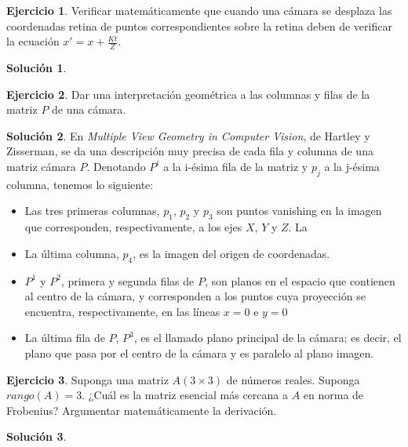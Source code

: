 \documentclass[a4paper, 11pt]{article}
\theoremstyle{definition}
\newtheorem{ejercicio}{Ejercicio}
\newtheorem*{solucion}{Solución}
\theoremstyle{theorem}
\begin{document}
    \begin{ejercicio}
        Verificar matemáticamente que cuando una cámara se desplaza las coordenadas retina de puntos correspondientes sobre la retina deben de verificar la ecuación $x'= x + \frac{Kt}{Z}$.
    \end{ejercicio}

    \begin{solucion}

    \end{solucion}

    \begin{ejercicio}
        Dar una interpretación geométrica a las columnas y filas de la matriz $P$ de una cámara.
    \end{ejercicio}

    \begin{solucion}
        En \emph{Multiple View Geometry in Computer Vision}, de Hartley y Zisserman, se da una descripción muy precisa de cada fila y columna de una matriz cámara $P$. Denotando $P^i$ a la i-ésima fila de la matriz y $p_j$ a la j-ésima columna, tenemos lo siguiente:
        \begin{itemize}
            \item Las tres primeras columnas, $p_1$, $p_2$ y $p_3$ son puntos vanishing en la imagen que corresponden, respectivamente, a los ejes $X$, $Y$ y $Z$. La \item La última columna, $p_4$, es la imagen del origen de coordenadas.
            \item $P^1$ y $P^2$, primera y segunda filas de $P$, son planos en el espacio que contienen al centro de la cámara, y corresponden a los puntos cuya proyección se encuentra, respectivamente, en las líneas $x=0$ e $y=0$
            \item La última fila de $P$, $P^3$, es el llamado plano principal de la cámara; es decir, el plano que pasa por el centro de la cámara y es paralelo al plano imagen.
        \end{itemize}
    \end{solucion}

    \begin{ejercicio}
        Suponga una matriz $A(3\times3)$ de números reales. Suponga $rango(A)=3$. ¿Cuál es la matriz esencial más cercana a $A$ en norma de Frobenius? Argumentar matemáticamente la derivación.
    \end{ejercicio}

    \begin{solucion}

    \end{solucion}
\end{document}

